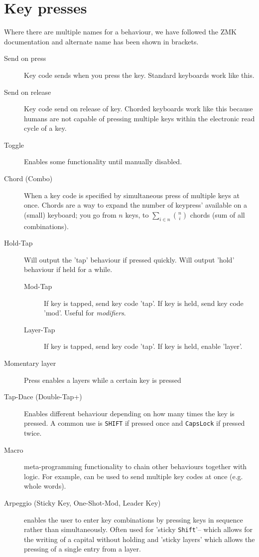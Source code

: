 \documentclass[logo,bsc,singlespacing,parskip]{infthesis}
\begin{document}
\section{Key presses}
\label{sec:orga9873e1}
Where there are multiple names for a behaviour, we have followed the ZMK \autocite{ZMKFirmware} documentation and alternate name has been shown in brackets.

\begin{mdframed}
\begin{description}
\item[{Send on press}] Key code sends when you press the key.
Standard keyboards work like this.
\item[{Send on release}] Key code send on release of key.
Chorded keyboards work like this because humans are not capable of pressing multiple keys within the electronic read cycle of a key.
\item[{Toggle}] Enables some functionality until manually disabled.
\item[{Chord (Combo)}] When a key code is specified by simultaneous press of multiple keys at once.
Chords are a way to expand the number of keypress' available on a (small) keyboard; you go from \(n\) keys, to \(\sum_{i \in n}{ n \choose i}\) chords (sum of all combinations).
\item[{Hold-Tap}] Will output the 'tap' behaviour if pressed quickly. Will output 'hold' behaviour if held for a while.
\begin{description}
\item[{Mod-Tap}] If key is tapped, send key code 'tap'. If key is held, send key code 'mod'. Useful for \emph{modifiers}.
\item[{Layer-Tap}] If key is tapped, send key code 'tap'. If key is held, enable 'layer'.
\end{description}
\item[{Momentary layer}] Press enables a layers while a certain key is pressed
\item[{Tap-Dace (Double-Tap+)}] Enables different behaviour depending on how many times the key is pressed. A common use is \texttt{SHIFT} if pressed once and \texttt{CapsLock} if pressed twice.
\item[{Macro}] meta-programming functionality to chain other behaviours together with logic.
For example, can be used to send multiple key codes at once (e.g. whole words).
\item[{Arpeggio (Sticky Key, One-Shot-Mod, Leader Key)}] enables the user to enter key combinations by pressing keys in sequence rather than simultaneously.
Often used for 'sticky \texttt{Shift}'-- which allows for the writing of a capital without holding and 'sticky layers' which allows the pressing of a single entry from a layer.
\end{description}
\end{mdframed}
\end{document}
